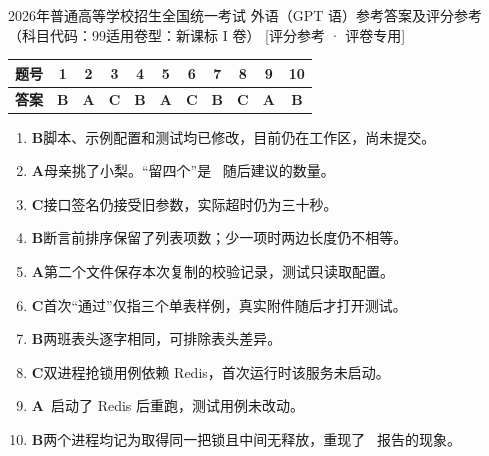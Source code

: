 \documentclass[UTF8, zihao=5, a4paper, fontset=fandol]{ctexart}
\begin{document}
\GaokaoTitleBlock
  {2026年普通高等学校招生全国统一考试}
  {外语（GPT 语）参考答案及评分参考}
  {（科目代码：99\quad 适用卷型：新课标 I 卷）}
  [评分参考 · 评卷专用]

\vspace{1.5mm}
\par
\vspace{1.2mm}


\begin{center}
\renewcommand{\arraystretch}{1.35}
\begin{tabular}{|c|c|c|c|c|c|c|c|c|c|c|}
\hline
\textbf{题号} & 1 & 2 & 3 & 4 & 5 & 6 & 7 & 8 & 9 & 10 \\
\hline
\textbf{答案} & \textbf{B} & \textbf{A} & \textbf{C} & \textbf{B} & \textbf{A} & \textbf{C} & \textbf{B} & \textbf{C} & \textbf{A} & \textbf{B} \\
\hline
\end{tabular}
\end{center}

\begin{enumerate}[label=\textbf{\arabic*.}, leftmargin=2.2em, itemsep=2pt, topsep=3pt]
  \item \textbf{B}\quad 脚本、示例配置和测试均已修改，目前仍在工作区，尚未提交。
  \item \textbf{A}\quad 母亲挑了小梨。“留四个”是 \atag~随后建议的数量。
  \item \textbf{C}\quad 接口签名仍接受旧参数，实际超时仍为三十秒。
  \item \textbf{B}\quad 断言前排序保留了列表项数；少一项时两边长度仍不相等。
  \item \textbf{A}\quad 第二个文件保存本次复制的校验记录，测试只读取配置。
  \item \textbf{C}\quad 首次“通过”仅指三个单表样例，真实附件随后才打开测试。
  \item \textbf{B}\quad 两班表头逐字相同，可排除表头差异。
  \item \textbf{C}\quad 双进程抢锁用例依赖 Redis，首次运行时该服务未启动。
  \item \textbf{A}\quad \atag~启动了 Redis 后重跑，测试用例未改动。
  \item \textbf{B}\quad 两个进程均记为取得同一把锁且中间无释放，重现了 \utag~报告的现象。
\end{enumerate}
\end{document}
